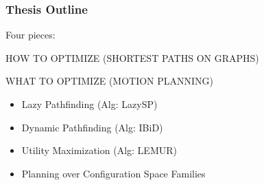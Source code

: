 
\begin{frame}
   \frametitle{Thesis Outline}

   Four pieces:

   HOW TO OPTIMIZE (SHORTEST PATHS ON GRAPHS)

   WHAT TO OPTIMIZE (MOTION PLANNING)

   \begin{itemize}
      \item Lazy Pathfinding (Alg: LazySP)
      \item Dynamic Pathfinding (Alg: IBiD)
      \item Utility Maximization (Alg: LEMUR)
      \item Planning over Configuration Space Families
   \end{itemize}

\end{frame}
